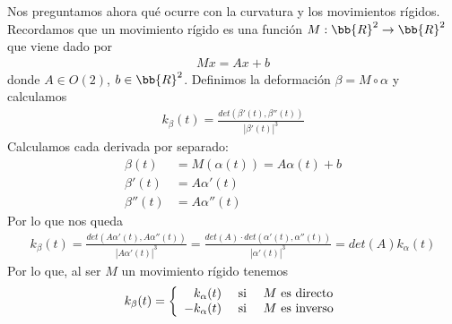 Nos preguntamos ahora qué ocurre con la curvatura y los movimientos rígidos. Recordamos que un movimiento rígido es una función $M:\bb{R}^2\to \bb{R}^2$ que viene dado por 
\begin{gather*}
    Mx = Ax + b
\end{gather*}
donde $A\in O(2)$, $b\in \bb{R}^2$. Definimos la deformación $\beta = M\circ \alpha$ y calculamos
\begin{gather*}
    k_\beta(t) = \frac{det(\beta'(t), \beta''(t))}{|\beta'(t)|^3}
\end{gather*}
Calculamos cada derivada por separado:
\begin{align*}
    \beta(t) &= M(\alpha(t)) = A\alpha(t)+b\\
    \beta'(t) &= A\alpha'(t)\\
    \beta''(t) &= A\alpha''(t)
\end{align*}
Por lo que nos queda
\begin{gather*}
    k_\beta(t) = \frac{det(A\alpha'(t), A\alpha''(t))}{|A\alpha'(t)|^3} = \frac{det(A) \cdot det(\alpha'(t),\alpha''(t))}{|\alpha'(t)|^3} = det(A) k_\alpha(t)
\end{gather*}
Por lo que, al ser $M$ un movimiento rígido tenemos 
\begin{gather*}
    k_\beta(t) = \left\{
        \begin{array}{r c l}
            k_\alpha(t) & \text{ si } & M \text{ es directo}\\
            -k_\alpha(t) & \text{ si } & M \text{ es inverso}\\
        \end{array}
    \right.
\end{gather*}

